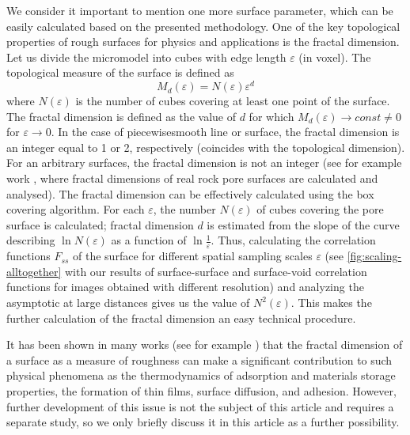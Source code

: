 \documentclass[reprint,amsmath,amssymb,aps,pre,showkeys,showpacs]{revtex4-1}
\begin{document}
We consider it important to mention one more surface parameter, which can be
easily calculated based on the presented methodology. One of the key topological
properties of rough surfaces for physics and applications is the fractal
dimension. Let us divide the micromodel into cubes with edge length
$\varepsilon$ (in voxel). The topological measure of the surface is defined as
\begin{equation*}
  M_d(\varepsilon) = N(\varepsilon) \varepsilon^d
\end{equation*}
where $N(\varepsilon)$ is the number of cubes covering at least one point of the
surface. The fractal dimension is defined as the value of $d$ for which
$M_d(\varepsilon) \rightarrow const \ne 0$ for $\varepsilon \rightarrow 0$. In
the case of piecewisesmooth line or surface, the fractal dimension is an integer
equal to 1 or 2, respectively (coincides with the topological dimension). For an
arbitrary surfaces, the fractal dimension is not an integer (see for example
work \cite{khlyupin2015fractal}, where fractal dimensions of real rock pore
surfaces are calculated and analysed). The fractal dimension can be effectively
calculated using the box covering algorithm. For each $\varepsilon$, the number
$N(\varepsilon)$ of cubes covering the pore surface is calculated; fractal
dimension $d$ is estimated from the slope of the curve describing
$\ln N(\varepsilon)$ as a function of $\ln \frac{1}{\varepsilon}$. Thus,
calculating the correlation functions $F_{ss}$ of the surface for different
spatial sampling scales $\varepsilon$ (see \cref{fig:scaling-alltogether} with
our results of surface-surface and surface-void correlation functions for images
obtained with different resolution) and analyzing the asymptotic at large
distances gives us the value of $N^2(\varepsilon)$. This makes the further
calculation of the fractal dimension an easy technical procedure.

It has been shown in many works (see for example
\cite{aslyamov2019theoretical,khlyupin2016effects,feder1988}) that the fractal
dimension of a surface as a measure of roughness can make a significant
contribution to such physical phenomena as the thermodynamics of adsorption and
materials storage properties, the formation of thin films, surface diffusion,
and adhesion. However, further development of this issue is not the subject of
this article and requires a separate study, so we only briefly discuss it in
this article as a further possibility.
\end{document}
